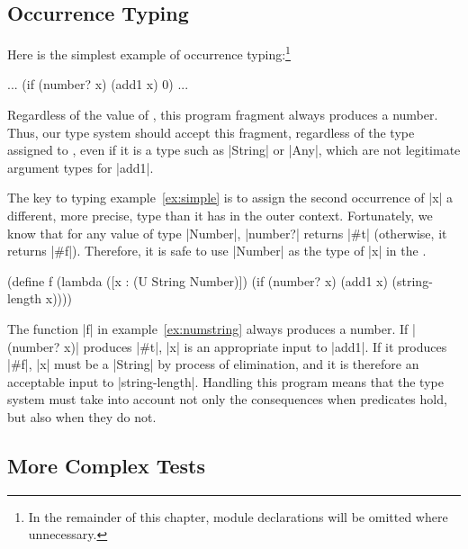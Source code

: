 \begin{schemeregion}
\section{Occurrence Typing}
\label{sec:occur}
Here is the simplest example of occurrence typing:\footnote{In the
  remainder of this chapter, module declarations will be omitted where
unnecessary.}

\begin{exmp}
\begin{schemedisplay}
... (if (number? x) (add1 x) 0) ...
\end{schemedisplay}
\label{ex:simple}
\end{exmp}

\noindent
Regardless of the value of , this program fragment always
produces a number.  Thus, our type system should accept this fragment,
regardless of the type assigned to , even if it is a type
such as \scheme|String| or \scheme|Any|, which are not legitimate
argument types for \scheme|add1|.

The key to typing example~\ref{ex:simple} is to assign the second occurrence of
\scheme|x| a different, more precise, type than it has in the outer
context.  
Fortunately, we know that for  any
value of type \scheme|Number|, \scheme|number?| returns
\scheme|#t| (otherwise, it returns \scheme|#f|).  Therefore, it is safe to use 
\scheme|Number| as the type
of \scheme|x|  in the \tbranch.

\begin{exmp}
\begin{schemedisplay}
(define f 
  (lambda ([x : (U String Number)])
    (if (number? x) (add1 x) (string-length x))))
\end{schemedisplay}
\label{ex:numstring}
\end{exmp}
\noindent
The function \scheme|f| in example~\ref{ex:numstring}
always produces a number. If \scheme|(number? x)| produces
\scheme|#t|, \scheme|x| is an appropriate input to \scheme|add1|. If it
produces \scheme|#f|, \scheme|x| must be a \scheme|String| by process of
elimination, and it is therefore an acceptable input to 
\scheme|string-length|.  Handling this program
means that the type system must take into account not only the consequences
 when predicates hold, but also when they do not.

\subsection{More Complex Tests}


\end{schemeregion}

